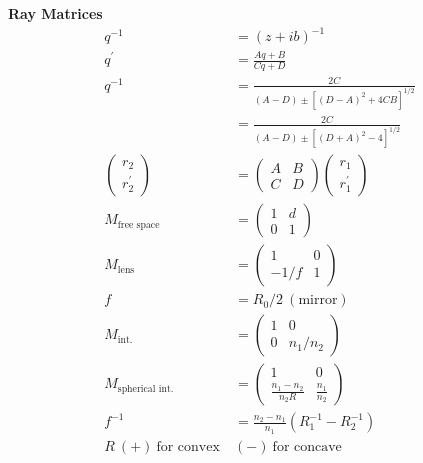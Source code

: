 \documentclass[12pt]{article}
\begin{document}
\begin{multicols}{2}
\textbf{Ray Matrices}
\begin{align}
  q^{-1} &= (z + ib)^{-1}\\
  q^{\prime} &= \frac{Aq + B}{Cq + D}\\
  q^{-1} &= \frac{2C}{(A-D) \pm [(D-A)^2+4CB]^{1/2}}\\
  &= \frac{2C}{(A-D) \pm [(D+A)^2-4]^{1/2}}\\
  \begin{pmatrix}r_2\\r_2^{\prime}\end{pmatrix} &=
  \begin{pmatrix} A & B\\C & D\end{pmatrix}
  \begin{pmatrix} r_1\\r_1^{\prime}\end{pmatrix}\\
  M_{\textrm{free space}} &= \begin{pmatrix}1 & d\\0 & 1\end{pmatrix}\\
  M_{\textrm{lens}} &= \begin{pmatrix}1 & 0\\-1/f & 1\end{pmatrix}\\
  f &= R_0 / 2 \ (\textrm{mirror})\\
  M_{\textrm{int.}} &= \begin{pmatrix}1 & 0\\0 & n_1/n_2\end{pmatrix}\\
    M_{\textrm{spherical int.}} &= \begin{pmatrix}1 & 0\\
      \frac{n_1 - n_2}{n_2R} & \frac{n_1}{n_2}\end{pmatrix}\\
    f^{-1} &= \frac{n_2 - n_1}{n_1}(R^{-1}_1 - R^{-1}_2)\\
    R \ (+) \ \textrm{for convex} \ &(-) \ \textrm{for concave}
\end{align}


\end{multicols}
\end{document}
